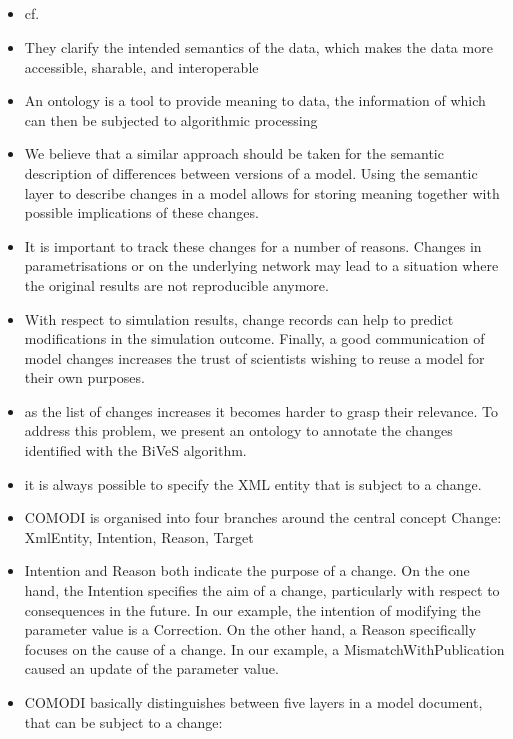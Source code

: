 	\subsection{\comodi}
	\label{sec:background:comodi}
	\begin{itemize}
		\item cf. \cite{Scharm2016}
		\item  They clarify the intended semantics of the data, which makes the data more accessible, sharable, and interoperable 
		\item An ontology is a tool to provide meaning to data, the information of which can then be subjected to algorithmic processing
		\item We believe that a similar approach should be taken for the semantic description of differences between versions of a model. Using the semantic layer to describe changes in a model allows for storing meaning together with possible implications of these changes.
		\item It is important to track these changes for a number of reasons. Changes in parametrisations or on the underlying network may lead to a situation where the original results are not reproducible anymore.
		\item With respect to simulation results, change records can help to predict modifications in the simulation outcome. Finally, a good communication of model changes increases the trust of scientists wishing to reuse a model for their own purposes.
		\item  as the list of changes increases it becomes harder to grasp their relevance. To address this problem, we present an ontology to annotate the changes identified with the BiVeS algorithm.
		\item  it is always possible to specify the XML entity that is subject to a change. 
		\item COMODI is organised into four branches around the central concept Change: XmlEntity, Intention, Reason, Target
		\item Intention and Reason both indicate the purpose of a change. On the one hand, the Intention specifies the aim of a change, particularly with respect to consequences in the future. In our example, the intention of modifying the parameter value is a Correction. On the other hand, a Reason specifically focuses on the cause of a change. In our example, a MismatchWithPublication caused an update of the parameter value.
		\item COMODI basically distinguishes between five layers in a model document, that can be subject to a change:

\end{itemize}
